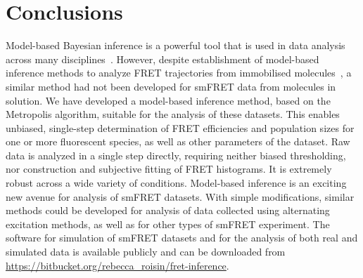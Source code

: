 
\section{Conclusions}
Model-based Bayesian inference is a powerful tool that is used in data analysis across many disciplines~\cite{mackay03}. However, despite establishment of model-based inference methods to analyze FRET trajectories from immobilised molecules~\cite{mckinney06, bronson09, bronson10, taylor10, taylor11}, a similar method had not been developed for smFRET data from molecules in solution. We have developed a model-based inference method, based on the Metropolis algorithm, suitable for the analysis of these datasets. This enables unbiased, single-step determination of FRET efficiencies and population sizes for one or more fluorescent species, as well as other parameters of the dataset. Raw data is analyzed in a single step directly, requiring neither biased thresholding, nor construction and subjective fitting of FRET histograms.  It is extremely robust across a wide variety of conditions. Model-based inference is an exciting new avenue for analysis of smFRET datasets. With simple modifications, similar methods could be developed for analysis of data collected using alternating excitation methods, as well as for other types of smFRET experiment. The software for simulation of smFRET datasets and for the analysis of both real and simulated data is available publicly and can be downloaded from \url{https://bitbucket.org/rebecca_roisin/fret-inference}. 
